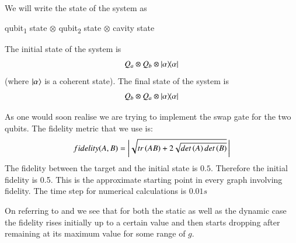 We will write the state of the system as
\begin{center}
qubit\textsubscript{1} state  $\otimes$  qubit\textsubscript{2} state \thinspace $\otimes$ cavity  state 
\end{center}
The initial state of the system is 
\begin{align}
Q_{a} \otimes Q_{b} \otimes \dyad {\alpha} 
\end{align}
(where $\ket{\alpha}$ is a coherent state). 
The final state of the system is 
\begin{align}
Q_{b} \otimes Q_{a} \otimes \dyad {\alpha} 
\end{align}

As one would soon realise we are trying to implement the swap gate for the two qubits. 
The fidelity metric that we use is:
\begin{align}
fidelity(A,B) = \bigg|\sqrt {tr\left( A B \right) + 2 \sqrt { det\left( A \right) det\left( B \right)}}\thinspace \bigg|
\end{align}
The fidelity between the target and the initial state is $0.5$. Therefore the initial fidelity is 0.5. This is the approximate starting point in every graph involving fidelity. The time step for numerical calculations is $0.01{s}$ 



On referring to  and  we see that for both the static as well as the dynamic case the fidelity rises initially up to a certain value and then starts dropping after remaining at its maximum value for some range of $g$. %



